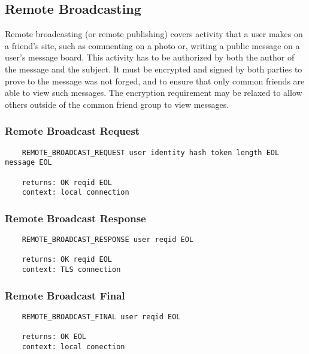 \documentclass[letterpaper,11pt,oneside]{article}
\begin{document}
\subsection{Remote Broadcasting}

Remote broadcasting (or remote publishing) covers activity that a user makes on
a friend's site, such as commenting on a photo or, writing a public message on
a user's message board. This activity has to be authorized by both the author
of the message and the subject. It must be encrypted and signed by both parties
to prove to the message was not forged, and to ensure that only common friends
are able to view such messages. The encryption requirement may be relaxed to
allow others outside of the common friend group to view messages.

\subsubsection{Remote Broadcast Request}

\vspace{10pt}
\begin{verbatim}
    REMOTE_BROADCAST_REQUEST user identity hash token length EOL message EOL

    returns: OK reqid EOL
    context: local connection
\end{verbatim}
\vspace{10pt}

\subsubsection{Remote Broadcast Response}

\vspace{10pt}
\begin{verbatim}
    REMOTE_BROADCAST_RESPONSE user reqid EOL 

    returns: OK reqid EOL
    context: TLS connection
\end{verbatim}
\vspace{10pt}

\subsubsection{Remote Broadcast Final}

\vspace{10pt}
\begin{verbatim}
    REMOTE_BROADCAST_FINAL user reqid EOL 

    returns: OK EOL
    context: local conection
\end{verbatim}
\vspace{10pt}
\end{document}
